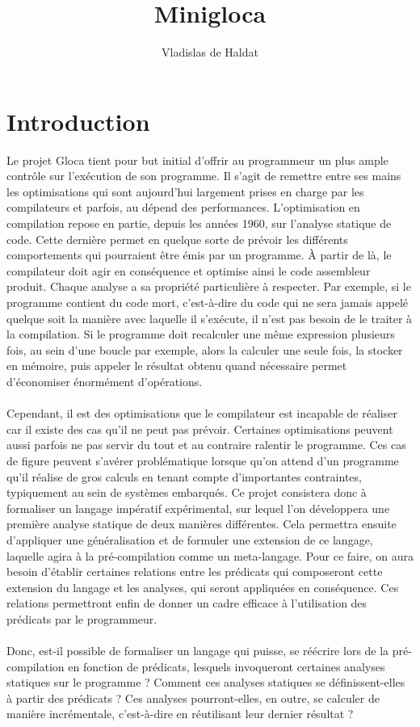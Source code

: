 \documentclass[a4paper, 10pt]{article}
\title{Minigloca}
\author{Vladislas de Haldat}
\begin{document}


\maketitle
\newpage
\tableofcontents
\newpage

\section{Introduction}
Le projet Gloca tient pour but initial d'offrir au programmeur un plus ample contrôle sur l'exécution de son programme.
Il s'agit de remettre entre ses mains les optimisations qui sont aujourd'hui largement prises en charge par les compilateurs
et parfois, au dépend des performances. L'optimisation en compilation repose en partie, depuis les années 1960, sur l'analyse statique de code. Cette
dernière permet en quelque sorte de prévoir les différents comportements qui pourraient être émis par un programme. À partir de là, le
compilateur doit agir en conséquence et optimise ainsi le code assembleur produit. Chaque analyse a sa propriété particulière à respecter.
Par exemple, si le programme contient du code mort, c'est-à-dire du code qui ne sera jamais appelé quelque soit la manière avec laquelle
il s'exécute, il n'est pas besoin de le traiter à la compilation. Si le programme doit recalculer une même expression plusieurs fois, au sein 
d'une boucle par exemple, alors la calculer une seule fois, la stocker en mémoire, puis appeler le résultat obtenu quand nécessaire permet 
d'économiser énormément d'opérations.
\\
\\
Cependant, il est des optimisations que le compilateur est incapable de réaliser car il existe des cas qu'il ne peut pas prévoir. Certaines
optimisations peuvent aussi parfois ne pas servir du tout et au contraire ralentir le programme. Ces cas de figure peuvent
s'avérer problématique lorsque qu'on attend d'un programme qu'il réalise de gros calculs en tenant compte d'importantes contraintes, typiquement au sein
de systèmes embarqués. Ce projet consistera donc à formaliser un langage impératif expérimental, sur lequel l'on développera une première analyse statique de deux manières
différentes. Cela permettra ensuite d'appliquer une généralisation et de formuler une extension de ce langage, laquelle agira à la pré-compilation comme un meta-langage.
Pour ce faire, on aura besoin d'établir certaines relations entre les prédicats qui composeront cette extension du langage et les
analyses, qui seront appliquées en conséquence. Ces relations permettront enfin de donner un cadre efficace à l'utilisation des prédicats par le programmeur.
\\
\\
Donc, est-il possible de formaliser un langage qui puisse, se réécrire lors de la pré-compilation en fonction de prédicats, lesquels invoqueront certaines
analyses statiques sur le programme ? Comment ces analyses statiques se définissent-elles à partir des prédicats ? Ces analyses pourront-elles, en outre,
se calculer de manière incrémentale, c'est-à-dire en réutilisant leur dernier résultat ?
\end{document}
